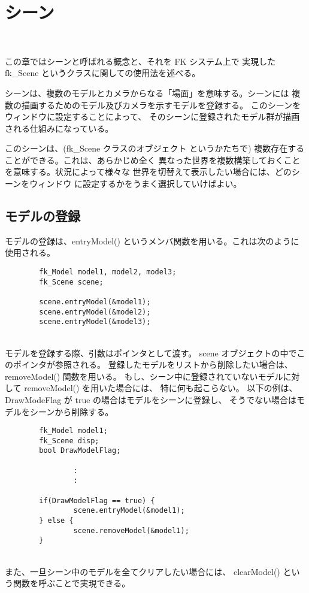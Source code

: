\chapter{シーン} \label{sec:scene} ~

この章ではシーンと呼ばれる概念と、それを FK システム上で
実現した fk\_Scene というクラスに関しての使用法を述べる。

シーンは、複数のモデルとカメラからなる「場面」を意味する。シーンには
複数の描画するためのモデル及びカメラを示すモデルを登録する。
このシーンをウィンドウに設定することによって、
そのシーンに登録されたモデル群が描画される仕組みになっている。

このシーンは、(fk\_Scene クラスのオブジェクト
というかたちで) 複数存在することができる。これは、あらかじめ全く
異なった世界を複数構築しておくことを意味する。状況によって様々な
世界を切替えて表示したい場合には、どのシーンをウィンドウ
に設定するかをうまく選択していけばよい。

\section{モデルの登録}
モデルの登録は、entryModel() というメンバ関数を用いる。これは次のように
使用される。
\\
\begin{breakbox}
\begin{verbatim}
        fk_Model model1, model2, model3;
        fk_Scene scene;

        scene.entryModel(&model1);
        scene.entryModel(&model2);
        scene.entryModel(&model3);
\end{verbatim}
\end{breakbox}
~ \\
モデルを登録する際、引数はポインタとして渡す。
scene オブジェクトの中でこのポインタが参照される。
登録したモデルをリストから削除したい場合は、removeModel() 関数を用いる。
もし、シーン中に登録されていないモデルに対して removeModel() を用いた場合には、
特に何も起こらない。
以下の例は、DrawModeFlag が true の場合はモデルをシーンに登録し、
そうでない場合はモデルをシーンから削除する。
\\
\begin{breakbox}
\begin{verbatim}
        fk_Model model1;
        fk_Scene disp;
        bool DrawModelFlag;

                :
                :

        if(DrawModelFlag == true) {
                scene.entryModel(&model1);
        } else {
                scene.removeModel(&model1);
        }
\end{verbatim}
\end{breakbox}
~ \\
また、一旦シーン中のモデルを全てクリアしたい場合には、
clearModel() という関数を呼ぶことで実現できる。

